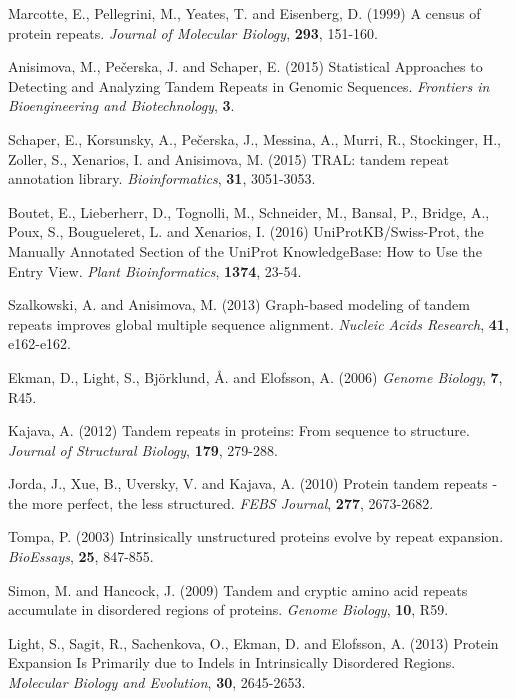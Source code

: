 \documentclass[a4,center,fleqn]{NAR}
\begin{document}
\begin{thebibliography}{4}
Marcotte, E., Pellegrini, M., Yeates, T. and Eisenberg, D. (1999) 
A census of protein repeats. 
\textit{Journal of Molecular Biology}, \textbf{293}, 151-160.

Anisimova, M., Pe\v{c}erska, J. and Schaper, E. (2015) 
Statistical Approaches to Detecting and Analyzing Tandem Repeats in Genomic Sequences. 
\textit{Frontiers in Bioengineering and Biotechnology}, \textbf{3}.

Schaper, E., Korsunsky, A., Pe\v{c}erska, J., Messina, A., Murri, R., Stockinger, H., Zoller, S., Xenarios, I. and Anisimova, M. (2015) 
TRAL: tandem repeat annotation library. 
\textit{Bioinformatics}, \textbf{31}, 3051-3053.

Boutet, E., Lieberherr, D., Tognolli, M., Schneider, M., Bansal, P., Bridge, A., Poux, S., Bougueleret, L. and Xenarios, I. (2016) 
UniProtKB/Swiss-Prot, the Manually Annotated Section of the UniProt KnowledgeBase: How to Use the Entry View. 
\textit{Plant Bioinformatics}, \textbf{1374}, 23-54.

Szalkowski, A. and Anisimova, M. (2013) 
Graph-based modeling of tandem repeats improves global multiple sequence alignment. 
\textit{Nucleic Acids Research}, \textbf{41}, e162-e162.

Ekman, D., Light, S., Bj\"orklund, \r{A}. and Elofsson, A. (2006) 
\textit{Genome Biology}, \textbf{7}, R45.

Kajava, A. (2012)
Tandem repeats in proteins: From sequence to structure. 
\textit{Journal of Structural Biology}, \textbf{179}, 279-288.

Jorda, J., Xue, B., Uversky, V. and Kajava, A. (2010) 
Protein tandem repeats - the more perfect, the less structured. 
\textit{FEBS Journal}, \textbf{277}, 2673-2682.

Tompa, P. (2003) 
Intrinsically unstructured proteins evolve by repeat expansion. 
\textit{BioEssays}, \textbf{25}, 847-855.

Simon, M. and Hancock, J. (2009) 
Tandem and cryptic amino acid repeats accumulate in disordered regions of proteins. 
\textit{Genome Biology}, \textbf{10}, R59.

Light, S., Sagit, R., Sachenkova, O., Ekman, D. and Elofsson, A. (2013) 
Protein Expansion Is Primarily due to Indels in Intrinsically Disordered Regions. 
\textit{Molecular Biology and Evolution}, \textbf{30}, 2645-2653.


\end{thebibliography}
\end{document}
